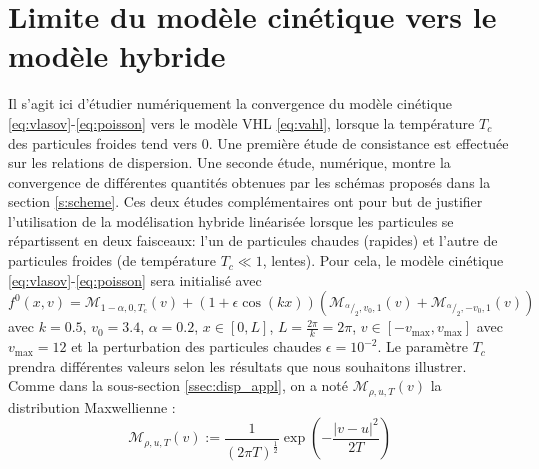 
\section{Limite du modèle cinétique vers le modèle hybride}
 \label{s:limit}

Il s'agit ici d'étudier numériquement la convergence du modèle cinétique \eqref{eq:vlasov}-\eqref{eq:poisson} vers le modèle VHL \eqref{eq:vahl}, lorsque la température $T_c$ des particules froides tend vers 0. Une première étude de consistance est effectuée sur les relations de dispersion. Une seconde étude, numérique, montre la convergence de différentes quantités obtenues par les schémas proposés dans la section \ref{s:scheme}. Ces deux études complémentaires ont pour but de justifier l'utilisation de la modélisation hybride linéarisée lorsque les particules se répartissent en deux faisceaux: l'un de particules chaudes (rapides) et l'autre de particules froides (de température $T_c\ll 1$, lentes). Pour cela, le modèle cinétique \eqref{eq:vlasov}-\eqref{eq:poisson} sera initialisé avec 
\begin{equation}
  f^0(x,v) = \mathcal{M}_{1-\alpha,0,T_c}(v) + (1+\epsilon\cos(kx))\left( \mathcal{M}_{^\alpha/_2,v_0,1}(v) + \mathcal{M}_{^\alpha/_2,-v_0,1}(v) \right)
\label{eq:K:init}
\end{equation}
avec $k = 0.5$, $v_0 = 3.4$, $\alpha=0.2$, $x\in[0,L]$, $L=\frac{2\pi}{k}=2\pi$, $v\in[-v_{\text{max}},v_{\text{max}}]$ avec $v_{\text{max}}=12$ et la perturbation des particules chaudes $\epsilon = 10^{-2}$.  Le paramètre $T_c$ prendra différentes valeurs selon les résultats que nous souhaitons illustrer. Comme dans la sous-section \ref{ssec:disp_appl}, on a noté  $\mathcal{M}_{\rho,u,T}(v)$ la distribution Maxwellienne :
$$
  \mathcal{M}_{\rho,u,T}(v) := \frac{1}{(2\pi T)^{\frac{1}{2}}}\exp\left(-\frac{\left|v-u\right|^2}{2T}\right)
$$

